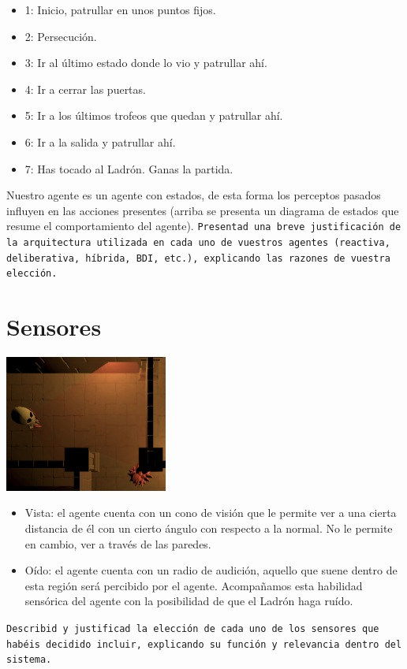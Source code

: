 \documentclass[a4paper,12pt]{article}
\begin{document}
\begin{itemize}
	\item 1: Inicio, patrullar en unos puntos fijos.
	\item 2: Persecución.
	\item 3: Ir al último estado donde lo vio y patrullar ahí.
	\item 4: Ir a cerrar las puertas.
	\item 5: Ir a los últimos trofeos que quedan y patrullar ahí.
	\item 6: Ir a la salida y patrullar ahí.
	\item 7: Has tocado al Ladrón. Ganas la partida.
\end{itemize}

Nuestro agente es un agente con estados, de esta forma los perceptos pasados influyen en las acciones presentes (arriba se presenta un diagrama de estados que resume el comportamiento del agente). 
\texttt{Presentad una breve justificación de la arquitectura utilizada en cada uno de vuestros agentes (reactiva, deliberativa, híbrida, BDI, etc.), explicando las razones de vuestra elección.}
\section*{\large Sensores}
    \centering \includegraphics[width=0.4\textwidth]{vision.png}\\
\begin{itemize}
	\item Vista: el agente cuenta con un cono de visión que le permite ver a una cierta distancia de él con un cierto ángulo con respecto a la normal. No le permite en cambio, ver a través de las paredes.
	\item Oído: el agente cuenta con un radio de audición, aquello que suene dentro de esta región será percibido por el agente. Acompañamos esta habilidad sensórica del agente con la posibilidad de que el Ladrón haga ruído.
\end{itemize}

\texttt{Describid y justificad la elección de cada uno de los sensores que habéis decidido incluir, explicando su función y relevancia dentro del sistema.}
\end{document}
